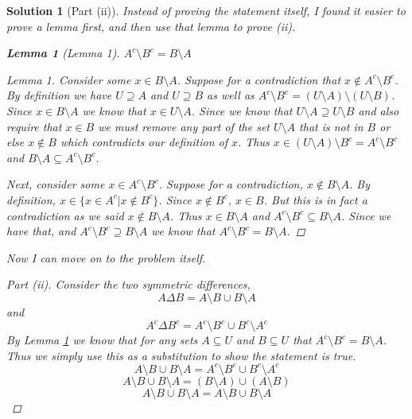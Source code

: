 \documentclass[leqno]{article}
\theoremstyle{nonumberplain}
\newtheorem{proof}{Proof}
\newtheorem{solution}{Solution}
\newtheorem{lemma}{Lemma}
\begin{document}
\begin{solution}[Part (ii)] Instead of proving the statement itself, I found it easier to prove a lemma first, and then use that lemma to prove (ii). 
\begin{lemma}[Lemma 1]$A^c \setminus B^c = B \setminus A$
\label{lemma: 1}
\begin{proof}[Lemma 1]
Consider some $x \in B\setminus A$.  Suppose for a contradiction that $x \notin A^c \setminus B^c$.  By definition we have $U\supseteq A$ and $U \supseteq B$ as well as $A^c \setminus B^c = (U \setminus A) \setminus (U \setminus B)$.  Since $x \in B \setminus A$ we know that $x \in U\setminus A$. Since we know that $U \setminus A \supseteq U \setminus B$ and also require that $x\in B$ we must remove any part of the set $U \setminus A$ that is \emph{not} in $B$ or else $x \notin B$ which contradicts our definition of $x$.  Thus $x \in (U\setminus A) \setminus B^c =A^c \setminus B^c$ and $B \setminus A \subseteq A^c \setminus B^c$.

Next, consider some $x \in A^c \setminus B^c$.  Suppose for a contradiction, $x\notin B \setminus A$.  By definition, $x \in \{x\in A^c | x\notin B^c\}$.  Since $x\notin B^c$, $x\in B$.  But this is in fact a contradiction as we said $x\notin B\setminus A$.  Thus $x\in B\setminus A$ and $A^c \setminus B^c \subseteq B\setminus A$.  Since we have that, and $A^c \setminus B^c \supseteq B\setminus A$ we know that $A^c \setminus B^c = B \setminus A$.
\end{proof}
\end{lemma} 
Now I can move on to the problem itself.

\begin{proof}[Part (ii)]Consider the two symmetric differences,
\[
A \Delta B = A\setminus B \cup B\setminus A
\]
and
\[
A^c \Delta B^c = A^c \setminus B^c \cup B^c \setminus A^c
\]
By \emph{Lemma \ref{lemma: 1}} we know that for any sets $A \subseteq U$ and $B \subseteq U$ that $A^c \setminus B^c = B\setminus A$.  Thus we simply use this as a substitution to show the statement is true.
\[
A\setminus B \cup B\setminus A = A^c \setminus B^c \cup B^c \setminus A^c
\]
\[
A\setminus B \cup B\setminus A = (B \setminus A) \cup (A \setminus B)
\]
\[
A\setminus B \cup B\setminus A = A \setminus B \cup B \setminus A
\]
\end{proof}

\end{solution}
\pagebreak

\end{document}
